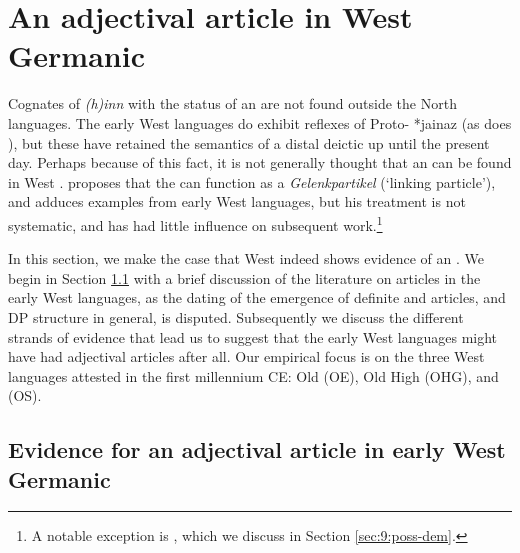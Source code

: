 \documentclass[output=paper,colorlinks,citecolor=brown]{langscibook}
\begin{document}
\section{An adjectival article in West Germanic}\label{sec:9:wgmc}

Cognates of \textit{(h)inn} with the status of an  are not found outside the North  languages. The early West  languages do exhibit reflexes of Proto- *jainaz (as does ), but these have retained the semantics of a distal deictic  up until the present day. Perhaps because of this fact, it is not generally thought that an  can be found in West . \citet[30--37]{Heinrichs54} proposes that the  can function as a \textit{Gelenkpartikel} (`linking particle'), and adduces examples from early West  languages, but his treatment is not systematic, and has had little influence on subsequent work.\footnote{A notable exception is \citet{Allen2006}, which we discuss in Section \ref{sec:9:poss-dem}.}

In this section, we make the case that West  indeed shows evidence of an . We begin in Section \ref{sec:9:adjart-eWGmc} with a brief discussion of the literature on articles in the early West  languages, as the dating of the emergence of definite and  articles, and DP structure in general, is disputed. Subsequently we discuss the different strands of evidence that lead us to suggest that the early West  languages might have had adjectival articles after all. Our empirical focus is on the three West  languages attested in the first millennium CE: Old  (OE), Old High  (OHG), and  (OS).

\subsection{Evidence for an adjectival article in early West Germanic}\label{sec:9:adjart-eWGmc}
\end{document}
